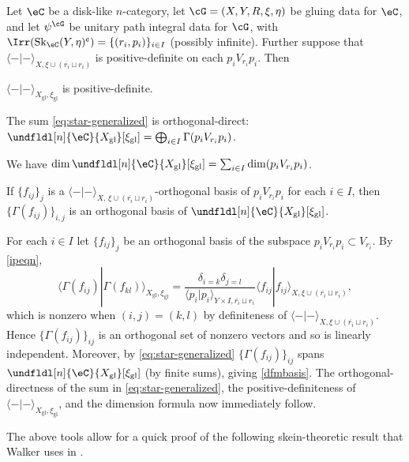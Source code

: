 \documentclass[12pt,reqno]{amsart}
\newcommand{\glu}{\mathrm{gl}}
\newcommand{\Sk}{\mathrm{Sk}}
\newcommand{\C}{\eC}
\newcommand{\fcj}[1]{\overline{#1}}
\newcommand{\bkt}[2]{\langle #1|#2 \rangle}
\newcommand{\cent}{\textup{\textcent}}
\renewcommand{\amalg}{\sqcup}
\begin{document}
\begin{proposition}
\label{glu-basis}
Let $\C$ be a disk-like $n$-category, let $\cG=(X,Y,R,\xi,\eta)$ be gluing data for $\C$, and let $\psi^\cG$ be unitary path integral data for $\cG$, with $\Irr(\Sk_\C(Y,\eta)^\cent)=\{(r_i,p_i)\}_{i\in I}$ (possibly infinite). Further suppose that $\bkt--_{X,\xi\cup(\fcj{r_i}\amalg r_i)}$ is positive-definite on each $p_iV_{r_i}p_i$. Then
\begin{lst} 
\item $\bkt--_{X_{\glu},\xi_{\glu}}$ is positive-definite.
\item\label{stardirect} The sum \eqref{eq:star-generalized} is orthogonal-direct: $\undfldl[n]{\C}{X_\glu}[\xi_\glu]=\bigoplus_{i\in I}\Gamma(p_iV_{r_i}p_i)$.
\item
\label{dimformula}
We have $\dim\undfldl[n]{\C}{X_{\glu}}[\xi_{\glu}]=\sum_{i\in I}\dim(p_iV_{r_i}p_i)$.
\item\label{dfmbasis} If $\{f_{ij}\}_j$ is a $\bkt--_{X,\,\xi\cup(\fcj{r_i}\amalg r_i)}$-orthogonal basis of $p_iV_{r_i}p_i$ for each $i\in I$, then $\{\Gamma(f_{ij})\}_{i,j}$ is an orthogonal basis of $\undfldl[n]{\C}{X_{\glu}}[\xi_{\glu}]$.
\end{lst}
\end{proposition}

\begin{pf}
For each $i\in I$ let $\{f_{ij}\}_j$ be an orthogonal basis of the subspace $p_iV_{r_i}p_i\subset V_{r_i}$. By \eqref{ipeqn},
\[
\bkt{\Gamma(f_{ij})}{\Gamma(f_{kl})}_{X_\glu,\xi_\glu}
=
\frac{\delta_{i=k}\delta_{j=l}}{\bkt{p_i}{p_i}_{Y\times I,\fcj{r_i}\amalg r_i}}\bkt{f_{ij}}{f_{ij}}_{X,\xi\cup(\fcj{r_i}\amalg r_i)},
\]
which is nonzero when $(i,j)=(k,l)$ by definiteness of $\bkt--_{X,\xi\cup(\fcj{r_i}\amalg r_i)}$. Hence $\{\Gamma(f_{ij})\}_{ij}$ is an orthogonal set of nonzero vectors and so is linearly independent. Moreover, by \eqref{eq:star-generalized} $\{\Gamma(f_{ij})\}_{ij}$ spans $\undfldl[n]{\C}{X_{\glu}}[\xi_{\glu}]$ (by finite sums), giving \ref{dfmbasis}. The orthogonal-directness of the sum in \eqref{eq:star-generalized}, the positive-definiteness of $\bkt--_{X_\glu,\xi_\glu}$, and the dimension formula now immediately follow.
\end{pf}

The above tools allow for a quick proof of the following skein-theoretic result that Walker uses in \cite{W21}.
\end{document}

